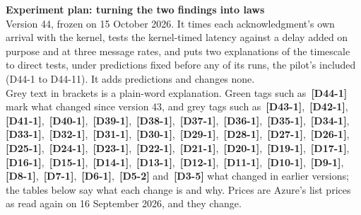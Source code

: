 \documentclass[11pt]{article}
\newcommand{\chg}[1]{\,{\color{chgcol}\bfseries\footnotesize[#1]}}
\newcommand{\chgold}[1]{\,{\color{oldcol}\bfseries\footnotesize[#1]}}
\begin{document}
{\LARGE\bfseries Experiment plan: turning the two findings into laws}\\[3pt]
{\large Version 44, frozen on 15 October 2026. It times each acknowledgment's own arrival with the kernel, tests the kernel-timed latency against a delay added on purpose and at three message rates, and puts two explanations of the timescale to direct tests, under predictions fixed before any of its runs, the pilot's included (D44-1 to D44-11). It adds predictions and changes none.}\\[4pt]
{\color{soft}\small Grey text in brackets is a plain-word explanation. Green tags such as \chg{D44-1} mark what changed since version 43, and grey tags such as \chgold{D43-1}, \chgold{D42-1}, \chgold{D41-1}, \chgold{D40-1}, \chgold{D39-1}, \chgold{D38-1}, \chgold{D37-1}, \chgold{D36-1}, \chgold{D35-1}, \chgold{D34-1}, \chgold{D33-1}, \chgold{D32-1}, \chgold{D31-1}, \chgold{D30-1}, \chgold{D29-1}, \chgold{D28-1}, \chgold{D27-1}, \chgold{D26-1}, \chgold{D25-1}, \chgold{D24-1}, \chgold{D23-1}, \chgold{D22-1}, \chgold{D21-1}, \chgold{D20-1}, \chgold{D19-1}, \chgold{D17-1}, \chgold{D16-1}, \chgold{D15-1}, \chgold{D14-1}, \chgold{D13-1}, \chgold{D12-1}, \chgold{D11-1}, \chgold{D10-1}, \chgold{D9-1}, \chgold{D8-1}, \chgold{D7-1}, \chgold{D6-1}, \chgold{D5-2} and \chgold{D3-5} what changed in earlier versions; the tables below say what each change is and why. Prices are Azure's list prices as read again on 16 September 2026, and they change.}
\end{document}
